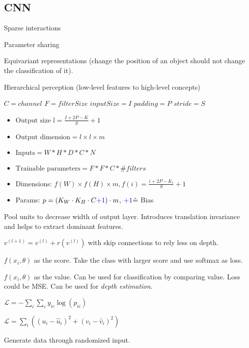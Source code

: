 \subsection{CNN}

  \begin{compactenum}
    \item Sparse interactions
    \item Parameter sharing
    \item Equivariant representations (change the position of an object should not change the classification of it).
    \item Hierarchical perception (low-level features to high-level concepts)
  \end{compactenum}


$C = channel$ $F = filterSize$ $inputSize = I$ $padding = P$
$stride = S$
  \begin{itemize}
    \item $\text{Output size l} = \frac{I + 2P - K}{S} + 1$
    \item $\text{Output dimension} = l \times l \times m $
    \item  $\text{Inputs} = W * H * D * C * N $
    \item $\text{Trainable parameters} = F * F * C * \# filters$
    \item Dimensions: \(f(W) \times f(H) \times m, f(i) = \frac{i + 2P - K_i}{S} + 1\)
    \item Params: \(p = (K_W \cdot K_H \cdot C \textcolor{H3}{+ 1}) \cdot m\), \(\textcolor{H3}{+ 1} \hat{=}\) Bias
  \end{itemize}


  Pool units to decrease width of output layer. Introduces translation invariance and helps to extract dominant features.


  \(v^{(l + 1)} = v^{(l)} + r(v^{(l)})\) with skip connections to rely less on depth.


  \(f(x_i, \theta)\) as the score. Take the class with larger score and use softmax as loss.


  \(f(x_i, \theta)\) as the value. Can be used for classification by comparing value. Loss could be MSE. Can be used for \textit{depth estimation}.


  \(\mathcal{L} =- \sum_i \sum_c y_{ic} \log(p_{ic})\)


  \(\mathcal{L} =\sum_i ((u_i -\hat{u}_i)^2 + (v_i - \hat{v}_i)^2)\)


  Generate data through randomized input.
